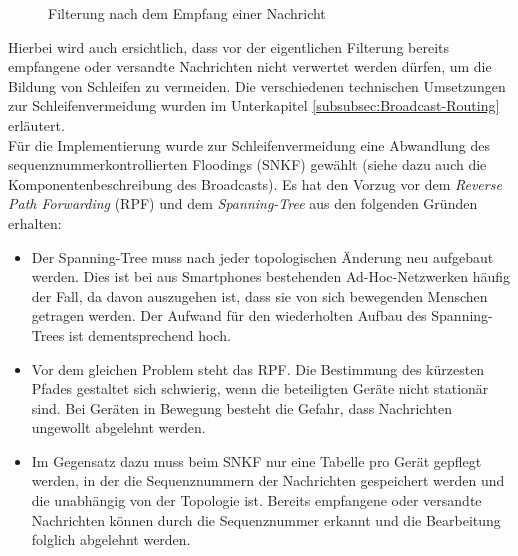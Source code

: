 \begin{figure}[H]
	\centering
	\caption{Filterung nach dem Empfang einer Nachricht}
	\label{fig:empfangNachricht}
\end{figure}
Hierbei wird auch ersichtlich, dass vor der eigentlichen Filterung bereits empfangene oder versandte Nachrichten nicht verwertet werden dürfen, um die Bildung von Schleifen zu vermeiden. Die verschiedenen technischen Umsetzungen zur Schleifenvermeidung wurden im Unterkapitel \ref{subsubsec:Broadcast-Routing} erläutert. 
\\Für die Implementierung wurde zur Schleifenvermeidung eine Abwandlung des sequenznummerkontrollierten Floodings (SNKF) gewählt (siehe dazu auch die Komponentenbeschreibung des Broadcasts). Es hat den Vorzug vor dem \textit{Reverse Path Forwarding} (RPF) und dem \textit{Spanning-Tree} aus den folgenden Gründen erhalten:
\begin{itemize}
	\item Der Spanning-Tree muss nach jeder topologischen Änderung neu aufgebaut werden. Dies ist bei aus Smartphones bestehenden Ad-Hoc-Netzwerken häufig der Fall, da davon auszugehen ist, dass sie von sich bewegenden Menschen getragen werden. Der Aufwand für den wiederholten Aufbau des Spanning-Trees ist dementsprechend hoch.
	\item Vor dem gleichen Problem steht das RPF. Die Bestimmung des kürzesten Pfades gestaltet sich schwierig, wenn die beteiligten Geräte nicht stationär sind. Bei Geräten in Bewegung besteht die Gefahr, dass Nachrichten ungewollt abgelehnt werden.
	\item Im Gegensatz dazu muss beim SNKF nur eine Tabelle pro Gerät gepflegt werden, in der die Sequenznummern der Nachrichten gespeichert werden und die unabhängig von der Topologie ist. Bereits empfangene oder versandte Nachrichten können durch die Sequenznummer erkannt und die Bearbeitung folglich abgelehnt werden.
\end{itemize}
